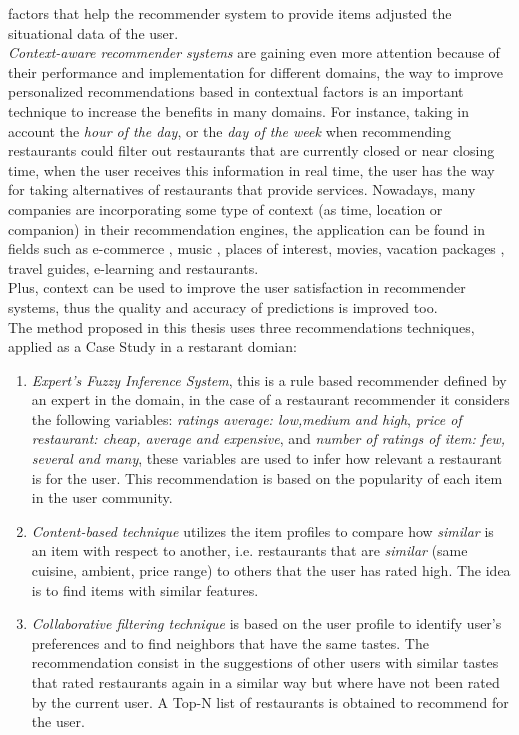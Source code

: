 factors that help the recommender system to provide items adjusted the
situational data of the user.\\
\textit{Context-aware recommender systems} are gaining even more
attention because of their performance and implementation for
different domains, the  way to improve personalized recommendations
based in contextual factors is an important technique to increase the
benefits in  many domains. For instance, taking in account the
\textit{hour of the day},  or the \textit{day of the week} when
recommending restaurants could  filter out restaurants that are
currently closed or near closing time, when the user receives this
information in real time, the user has the  way for taking
alternatives of restaurants that provide services. Nowadays, many
companies are incorporating some type of context (as time, location or
companion) in their recommendation engines, the application can be
found in fields such as e-commerce\cite{schafer1999recommender}
\cite{bulander2005enabling}, music\cite{ricci2012context}
\cite{baltrunas2011incarmusic} \cite{huq2010automated}, places of
interest\cite{baltrunas2012context},
movies\cite{eyjolfsdottir2010moviegen}, vacation
packages\cite{liu2011personalized} \cite{liu2014cocktail},  travel
guides\cite{savage2012m}, e-learning\cite{ortigosa2010entornos}  and
restaurants\cite{chu2013chinese}.\\
Plus, context can be used to improve the user satisfaction  in
recommender systems, thus the quality and accuracy of predictions  
is improved too. \\
The method proposed in this thesis uses three recommendations techniques,
applied as a Case Study in a restarant domian:
\begin{enumerate} 
\item \textit{Expert's Fuzzy Inference System}, this is a rule based 
recommender defined by an expert in the domain, in the case of 
a restaurant recommender it considers the following
variables: \textit{ratings average: low,medium and high},
\textit{price of restaurant: cheap, average and expensive}, and
\textit{number of ratings of item: few, several and many}, these
variables are used to infer how relevant a restaurant is for the user.
This recommendation is based on the popularity of each item in the
user community.
\item \textit{Content-based technique} utilizes the item profiles 
to compare how \textit{similar} is an item with respect to 
another, i.e. restaurants that are \textit{similar} (same cuisine, 
ambient, price range) to others that the user has rated high. 
The idea is to find items with similar features. 
\item \textit{Collaborative filtering technique} is based on the user
profile to identify user's preferences and to find neighbors that
have the same tastes. The recommendation consist in the suggestions of
other users with similar tastes that rated restaurants again in a
similar way but where have not been rated by the current user. A Top-N
list of restaurants is obtained to recommend for the user.
\end{enumerate} 
